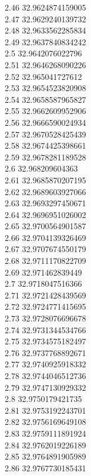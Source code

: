 {2.46	32.9624874159005\\
2.47	32.9629240139732\\
2.48	32.9633562285834\\
2.49	32.9637840834242\\
2.5	32.9642076022796\\
2.51	32.9646268090226\\
2.52	32.965041727612\\
2.53	32.9654523820908\\
2.54	32.9658587965827\\
2.55	32.9662609952906\\
2.56	32.9666590024934\\
2.57	32.9670528425439\\
2.58	32.9674425398661\\
2.59	32.9678281189528\\
2.6	32.968209604363\\
2.61	32.9685870207195\\
2.62	32.9689603927066\\
2.63	32.9693297450671\\
2.64	32.9696951026002\\
2.65	32.9700564901587\\
2.66	32.9704139326469\\
2.67	32.9707674550179\\
2.68	32.9711170822709\\
2.69	32.971462839449\\
2.7	32.9718047516366\\
2.71	32.9721428439569\\
2.72	32.9724771415695\\
2.73	32.9728076696678\\
2.74	32.9731344534766\\
2.75	32.9734575182497\\
2.76	32.9737768892671\\
2.77	32.9740925918332\\
2.78	32.9744046512736\\
2.79	32.9747130929332\\
2.8	32.9750179421735\\
2.81	32.9753192243701\\
2.82	32.9756169649108\\
2.83	32.9759111891924\\
2.84	32.9762019226189\\
2.85	32.9764891905989\\
2.86	32.9767730185431\\
}
